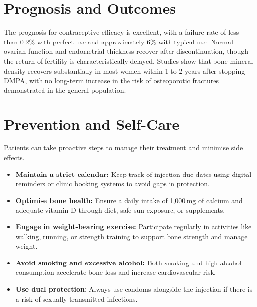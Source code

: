 \section*{Prognosis and Outcomes}
The prognosis for contraceptive efficacy is excellent, with a failure rate of less than 0.2\% with perfect use and approximately 6\% with typical use. Normal ovarian function and endometrial thickness recover after discontinuation, though the return of fertility is characteristically delayed. Studies show that bone mineral density recovers substantially in most women within 1 to 2 years after stopping DMPA, with no long-term increase in the risk of osteoporotic fractures demonstrated in the general population.

\section*{Prevention and Self-Care}
Patients can take proactive steps to manage their treatment and minimise side effects.
\begin{itemize}
    \item \textbf{Maintain a strict calendar:} Keep track of injection due dates using digital reminders or clinic booking systems to avoid gaps in protection.
    \item \textbf{Optimise bone health:} Ensure a daily intake of 1,000\,mg of calcium and adequate vitamin D through diet, safe sun exposure, or supplements.
    \item \textbf{Engage in weight-bearing exercise:} Participate regularly in activities like walking, running, or strength training to support bone strength and manage weight.
    \item \textbf{Avoid smoking and excessive alcohol:} Both smoking and high alcohol consumption accelerate bone loss and increase cardiovascular risk.
    \item \textbf{Use dual protection:} Always use condoms alongside the injection if there is a risk of sexually transmitted infections.
\end{itemize}

